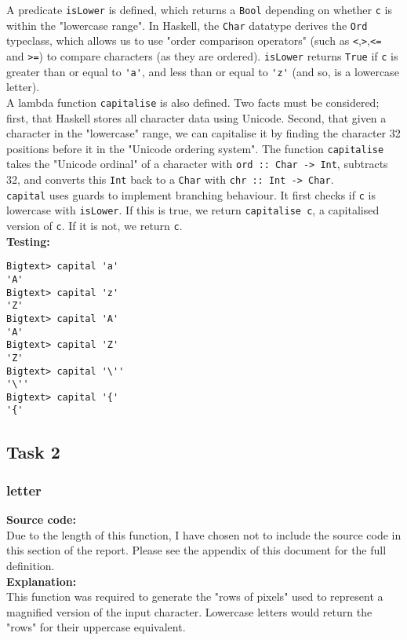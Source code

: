 \documentclass[11pt]{article}
\begin{document}
A predicate {\verb|isLower|} is defined, which returns a {\verb|Bool|} depending on whether {\verb|c|} is within the "lowercase range". In Haskell, the {\verb|Char|} datatype derives the {\verb|Ord|} typeclass, which allows us to use "order comparison operators" (such as {\verb|<|},{\verb|>|},{\verb|<=|} and {\verb|>=|}) to compare characters (as they are ordered). {\verb|isLower|} returns {\verb|True|} if {\verb|c|} is greater than or equal to {\verb|'a'|}, and less than or equal to {\verb|'z'|} (and so, is a lowercase letter). \\

A lambda function {\verb|capitalise|} is also defined. Two facts must be considered; first, that Haskell stores all character data using Unicode. Second, that given a character in the "lowercase" range, we can capitalise it by finding the character 32 positions before it in the "Unicode ordering system". The function {\verb|capitalise|} takes the "Unicode ordinal" of a character with {\verb|ord :: Char -> Int|}, subtracts 32, and converts this {\verb|Int|} back to a {\verb|Char|} with {\verb|chr :: Int -> Char|}. \\

{\verb|capital|} uses guards to implement branching behaviour. It first checks if {\verb|c|} is lowercase with {\verb|isLower|}. If this is true, we return {\verb|capitalise c|}, a capitalised version of {\verb|c|}. If it is not, we return {\verb|c|}. \\

\newpage
\textbf{Testing:}
\begin{verbatim}
Bigtext> capital 'a'
'A'
Bigtext> capital 'z'
'Z'
Bigtext> capital 'A'
'A'
Bigtext> capital 'Z'
'Z'
Bigtext> capital '\''
'\''
Bigtext> capital '{'
'{'
\end{verbatim}

\subsection{Task 2}
\subsubsection{letter}
\textbf{Source code:}\\
Due to the length of this function, I have chosen not to include the source code in this section of the report. Please see the appendix of this document for the full definition. \\

\textbf{Explanation:}\\
This function was required to generate the "rows of pixels" used to represent a magnified version of the input character. Lowercase letters would return the "rows" for their uppercase equivalent. \\
\end{document}
